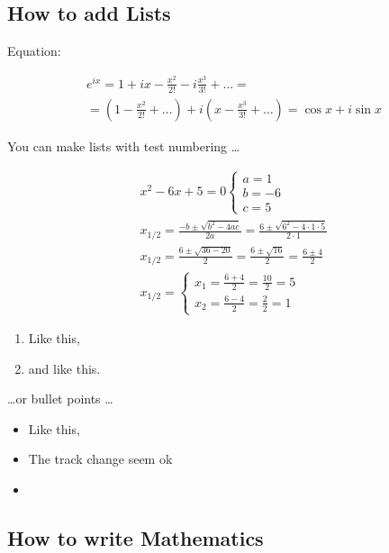 \documentclass{article}
\begin{document}
\subsection{How to add Lists}

Equation:

\begin{equation}
    \begin{array}{c}
e^{i x}=1+i x-\frac{x^{2}}{2!}-i \frac{x^{3}}{3!}+\ldots= \\
=\left(1-\frac{x^{2}}{2!}+\ldots\right)+i\left(x-\frac{x^{3}}{3!}+\ldots\right)=\cos x+i \sin x
\end{array}
\end{equation}



You can make lists with test numbering \dots

\begin{equation}
    \begin{array}{l}
x^{2}-6 x+5=0\left\{\begin{array}{l}
a=1 \\
b=-6 \\
c=5
\end{array}\right. \\
x_{1 / 2}=\frac{-b \pm \sqrt{b^{2}-4 a c}}{2 a}=\frac{6 \pm \sqrt{6^{2}-4 \cdot 1 \cdot 5}}{2 \cdot 1} \\
x_{1 / 2}=\frac{6 \pm \sqrt{36-20}}{2}=\frac{6 \pm \sqrt{16}}{2}=\frac{6 \pm 4}{2} \\
x_{1 / 2}=\left\{\begin{array}{l}
x_{1}=\frac{6+4}{2}=\frac{10}{2}=5 \\
x_{2}=\frac{6-4}{2}=\frac{2}{2}=1
\end{array}\right.
\end{array}
\end{equation}

\begin{enumerate}
\item Like this,
\item and like this.
\end{enumerate}
\dots or bullet points \dots
\begin{itemize}
\item Like this,

\item The track change seem ok
\item 
\end{itemize}

\subsection{How to write Mathematics}
\end{document}
